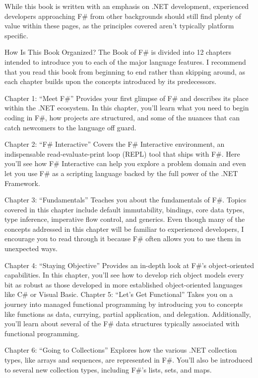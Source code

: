 \documentclass{book}
\begin{document}
While this book is written with an emphasis on .NET development, experienced developers approaching F\# from other backgrounds should still find plenty of value within these pages, as the principles covered aren’t typically platform specific.

How Is This Book Organized?
The Book of F\# is divided into 12 chapters intended to introduce you to each of the major language features. I recommend that you read this book from beginning to end rather than skipping around, as each chapter builds upon the concepts introduced by its predecessors.

Chapter 1: “Meet F\#”  Provides your first glimpse of F\# and describes its place within the .NET ecosystem. In this chapter, you’ll learn what you need to begin coding in F\#, how projects are structured, and some of the nuances that can catch newcomers to the language off guard.

Chapter 2: “F\# Interactive”  Covers the F\# Interactive environment, an indispensable read-evaluate-print loop (REPL) tool that ships with F\#. Here you’ll see how F\# Interactive can help you explore a problem domain and even let you use F\# as a scripting language backed by the full power of the .NET Framework.

Chapter 3: “Fundamentals”  Teaches you about the fundamentals of F\#. Topics covered in this chapter include default immutability, bindings, core data types, type inference, imperative flow control, and generics. Even though many of the concepts addressed in this chapter will be familiar to experienced developers, I encourage you to read through it because F\# often allows you to use them in unexpected ways.

Chapter 4: “Staying Objective”  Provides an in-depth look at F\#’s object-oriented capabilities. In this chapter, you’ll see how to develop rich object models every bit as robust as those developed in more established object-oriented languages like C\# or Visual Basic. Chapter 5: “Let’s Get Functional”  Takes you on a journey into managed functional programming by introducing you to concepts like functions as data, currying, partial application, and delegation. Additionally, you’ll learn about several of the F\# data structures typically associated with functional programming.

Chapter 6: “Going to Collections”  Explores how the various .NET collection types, like arrays and sequences, are represented in F\#. You’ll also be introduced to several new collection types, including F\#’s lists, sets, and maps.
\end{document}
